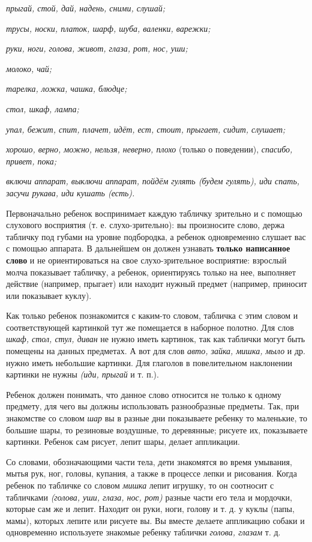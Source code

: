 \documentclass[a5paper]{book}
\renewcommand{\emph}[1]{\textit{#1}}
\begin{document}
\emph{прыгай, стой, дай, надень, сними, слушай;}

\emph{трусы, носки, платок, шарф, шуба, валенки, варежки;}

\emph{руки, ноги, голова, живот, глаза, рот, нос, уши;}

\emph{молоко, чай;}

\emph{тарелка, ложка, чашка, блюдце;}

\emph{стол, шкаф, лампа;}

\emph{упал, бежит, спит, плачет, идёт, ест, стоит, прыгает, сидит,
слушает;}

\emph{хорошо, верно, можно, нельзя, неверно, плохо} (только о
поведении), \emph{спасибо, привет, пока;}

\emph{включи аппарат, выключи аппарат, пойдём гулять (будем гулять), иди
спать, засучи рукава, иди кушать (есть).}

Первоначально ребенок воспринимает каждую табличку зрительно и с помощью
слухового восприятия (т. е. слухо-зрительно): вы произносите слово,
держа табличку под губами на уровне подбородка, а ребенок одновременно
слушает вас с помощью аппарата. В дальнейшем он должен узнавать
\textbf{только написанное слово} и не ориентироваться на свое
слухо-зрительное восприятие: взрослый молча показывает табличку, а
ребенок, ориентируясь только на нее, выполняет действие (например,
прыгает) или находит нужный предмет (например, приносит или показывает
куклу).

Как только ребенок познакомится с каким-то словом, табличка с этим
словом и соответствующей картинкой тут же помещается в наборное полотно.
Для слов \emph{шкаф, стол, стул, диван} не нужно иметь картинок, так как
таблички могут быть помещены на данных предметах. А вот для слов
\emph{авто, зайка, мишка, мыло} и др. нужно иметь небольшие картинки.
Для глаголов в повелительном наклонении картинки не нужны \emph{(иди,
прыгай} и т. п.).

Ребенок должен понимать, что данное слово относится не только к одному
предмету, для чего вы должны использовать разнообразные предметы. Так,
при знакомстве со словом \emph{шар} вы в разные дни показываете ребенку
то маленькие, то большие шары, то резиновые воздушные, то деревянные;
рисуете их, показываете картинки. Ребенок сам рисует, лепит шары, делает
аппликации.

Со словами, обозначающими части тела, дети знакомятся во время умывания,
мытья рук, ног, головы, купания, а также в процессе лепки и рисования.
Когда ребенок по табличке со словом \emph{мишка} лепит игрушку, то он
соотносит с табличками \emph{(голова, уши, глаза, нос, рот)} разные
части его тела и мордочки, которые сам же и лепит. Находит он руки,
ноги, голову и т. д. у куклы (папы, мамы), которых лепите или рисуете
вы. Вы вместе делаете аппликацию собаки и одновременно используете
знакомые ребенку таблички \emph{голова, глазам} т. д.
\end{document}
